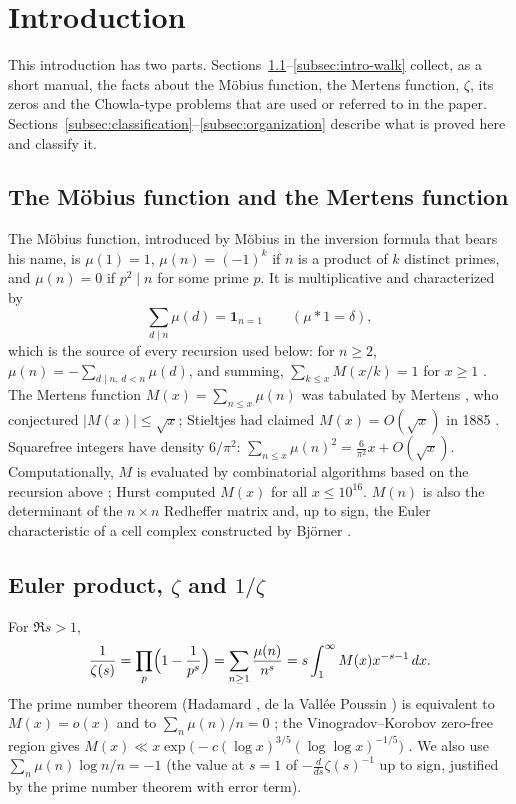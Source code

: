 \documentclass[11pt]{amsart}
\numberwithin{equation}{section}
\theoremstyle{plain}
\theoremstyle{definition}
\theoremstyle{remark}
\begin{document}
\tableofcontents

\section{Introduction}
\label{sec:introduction}

This introduction has two parts. Sections~\ref{subsec:intro-mobius}--\ref{subsec:intro-walk}
collect, as a short manual, the facts about the Möbius function, the Mertens
function, $\zeta$, its zeros and the Chowla-type problems that are used or
referred to in the paper. Sections~\ref{subsec:classification}--\ref{subsec:organization}
describe what is proved here and classify it.

\subsection{The Möbius function and the Mertens function}
\label{subsec:intro-mobius}
The Möbius function, introduced by Möbius \cite{Mobius1832} in the
inversion formula that bears his name, is $\mu(1)=1$, $\mu(n)=(-1)^k$ if $n$
is a product of $k$ distinct primes, and $\mu(n)=0$ if $p^2\mid n$ for some
prime $p$. It is multiplicative and characterized by
\[
\sum_{d\mid n}\mu(d)=\mathbf 1_{n=1}\qquad(\mu*1=\delta),
\]
which is the source of every recursion used below: for $n\ge2$,
$\mu(n)=-\sum_{d\mid n,\,d<n}\mu(d)$, and summing,
$\sum_{k\le x}M(x/k)=1$ for $x\ge1$ \cite[\S3.2]{MontgomeryVaughan2007}.
The Mertens function $M(x)=\sum_{n\le x}\mu(n)$ was tabulated by Mertens
\cite{Mertens1897}, who conjectured $|M(x)|\le\sqrt x$; Stieltjes had
claimed $M(x)=O(\sqrt x)$ in 1885 \cite{Stieltjes1905}. Squarefree integers
have density $6/\pi^2$: $\sum_{n\le x}\mu(n)^2=\frac6{\pi^2}x+O(\sqrt x)$.
Computationally, $M$ is evaluated by combinatorial algorithms based on the
recursion above \cite{DelegliseRivat1996,HT23}; Hurst \cite{Hurst18}
computed $M(x)$ for all $x\le10^{16}$. $M(n)$ is also the determinant of the
$n\times n$ Redheffer matrix \cite{Redheffer1977} and, up to sign, the
Euler characteristic of a cell complex constructed by Björner
\cite{Bjorner2011}.

\subsection{Euler product, $\zeta$ and $1/\zeta$}
For $\Re s>1$,
\[
\frac1{\zeta(s)}=\prod_p\Bigl(1-\frac1{p^s}\Bigr)=\sum_{n\ge1}\frac{\mu(n)}{n^s}
=s\int_1^\infty M(x)x^{-s-1}\,dx .
\]
The prime number theorem (Hadamard \cite{Hadamard1896}, de la Vallée
Poussin \cite{dlVP1896}) is equivalent to $M(x)=o(x)$ \cite{Landau1911}
and to $\sum_{n}\mu(n)/n=0$ \cite{vonMangoldt1897}; the Vinogradov--Korobov
zero-free region gives
$M(x)\ll x\exp\bigl(-c(\log x)^{3/5}(\log\log x)^{-1/5}\bigr)$
\cite{Walfisz1963,Ford2002}. We also use
$\sum_n\mu(n)\log n/n=-1$ (the value at $s=1$ of $-\frac{d}{ds}\zeta(s)^{-1}$
up to sign, justified by the prime number theorem with error term).
\end{document}
